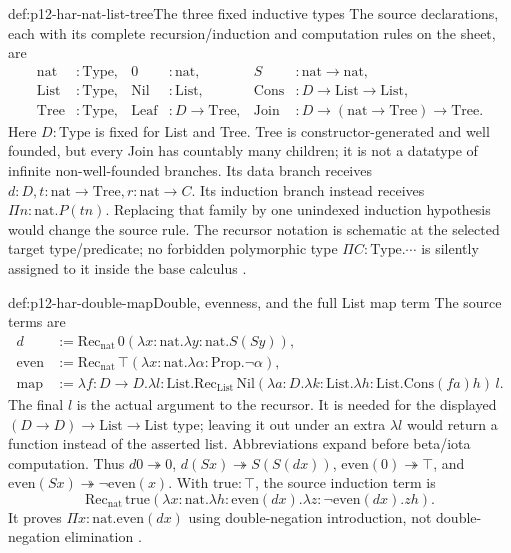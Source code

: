 \begin{hbdefinition}{def:p12-har-nat-list-tree}{The three fixed inductive types}
The source declarations, each with its complete recursion/induction and
computation rules on the sheet, are
\[
\begin{aligned}
 \mathrm{nat}&:\mathrm{Type},&
 0&:\mathrm{nat},&S&:\mathrm{nat}\to\mathrm{nat},\\
 \mathrm{List}&:\mathrm{Type},&
 \mathrm{Nil}&:\mathrm{List},&
 \mathrm{Cons}&:D\to\mathrm{List}\to\mathrm{List},\\
 \mathrm{Tree}&:\mathrm{Type},&
 \mathrm{Leaf}&:D\to\mathrm{Tree},&
 \mathrm{Join}&:D\to(\mathrm{nat}\to\mathrm{Tree})\to\mathrm{Tree}.
\end{aligned}
\]
Here \(D:\mathrm{Type}\) is fixed for List and Tree. Tree is
constructor-generated and well founded, but every Join has countably many
children; it is not a datatype of infinite non-well-founded branches.
Its data branch receives
\(d:D,t:\mathrm{nat}\to\mathrm{Tree},
r:\mathrm{nat}\to C\). Its induction branch instead receives
\(\Pi n:\mathrm{nat}.P(tn)\). Replacing that family by one
unindexed induction hypothesis would change the source rule.
The recursor notation is schematic at the selected target type/predicate;
no forbidden polymorphic type \(\Pi C:\mathrm{Type}.\cdots\)
is silently assigned to it inside the base calculus
\cite[pp.~1206--1209]{BarendregtGeuvers2001}.
\end{hbdefinition}

\begin{hbexample}{def:p12-har-double-map}{Double, evenness, and the full List map term}
The source terms are
\[
\begin{aligned}
 d&:=\mathrm{Rec}_{\mathrm{nat}}\,0
       (\lambda x:\mathrm{nat}.\lambda y:\mathrm{nat}.S(Sy)),\\
 \mathrm{even}&:=\mathrm{Rec}_{\mathrm{nat}}\,\top
       (\lambda x:\mathrm{nat}.\lambda\alpha:\mathrm{Prop}.\neg\alpha),\\
 \mathrm{map}&:=\lambda f:D\to D.\lambda l:\mathrm{List}.
       \mathrm{Rec}_{\mathrm{List}}\,\mathrm{Nil}
       (\lambda a:D.\lambda k:\mathrm{List}.
          \lambda h:\mathrm{List}.\mathrm{Cons}(fa)h)\,l.
\end{aligned}
\]
The final \(l\) is the actual argument to the recursor. It is needed
for the displayed \((D\to D)\to\mathrm{List}\to\mathrm{List}\)
type; leaving it out under an extra \(\lambda l\) would return a
function instead of the asserted list. Abbreviations expand before
beta/iota computation. Thus \(d0\twoheadrightarrow0\),
\(d(Sx)\twoheadrightarrow S(S(dx))\),
\(\mathrm{even}(0)\twoheadrightarrow\top\), and
\(\mathrm{even}(Sx)\twoheadrightarrow\neg\mathrm{even}(x)\).
With \(\mathrm{true}:\top\), the source induction term is
\[
 \mathrm{Rec}_{\mathrm{nat}}\,\mathrm{true}
 (\lambda x:\mathrm{nat}.\lambda h:\mathrm{even}(dx).
    \lambda z:\neg\mathrm{even}(dx).zh).
\]
It proves \(\Pi x:\mathrm{nat}.\mathrm{even}(dx)\) using
double-negation introduction, not double-negation elimination
\cite[pp.~1207--1208]{BarendregtGeuvers2001}.
\end{hbexample}

